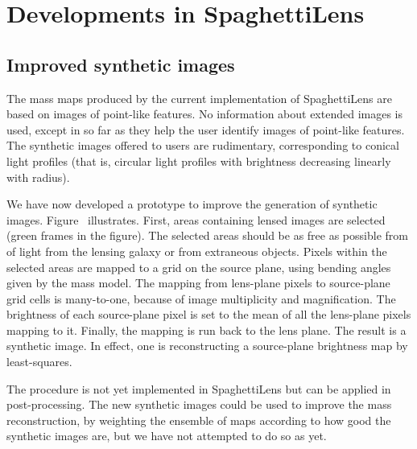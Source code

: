 \section{Developments in SpaghettiLens}

\subsection{Improved synthetic images}\label{subsec:sourcefit}

The mass maps produced by the current implementation of SpaghettiLens are
based on images of point-like features.  No information about extended
images is used, except in so far as they help the user identify images
of point-like features.  The synthetic images offered to users are
rudimentary, corresponding to conical light profiles (that is,
circular light profiles with brightness decreasing linearly with radius).

We have now developed a prototype to improve the generation of synthetic
images.  Figure~ illustrates.  First, areas
containing lensed images are selected (green frames in the figure).
The selected areas should be as free as possible from of light from
the lensing galaxy or from extraneous objects.  Pixels within the
selected areas are mapped to a grid on the source plane, using bending
angles given by the mass model.  The mapping from lens-plane pixels to
source-plane grid cells is many-to-one, because of image multiplicity
and magnification.  The brightness of each source-plane pixel is set
to the mean of all the lens-plane pixels mapping to it.  Finally, the
mapping is run back to the lens plane.  The result is a synthetic
image.  In effect, one is reconstructing a source-plane brightness map
by least-squares.

The procedure is not yet implemented in SpaghettiLens but can be
applied in post-processing.  The new synthetic images could be used to
improve the mass reconstruction, by weighting the ensemble of maps
according to how good the synthetic images are, but we have not
attempted to do so as yet.

